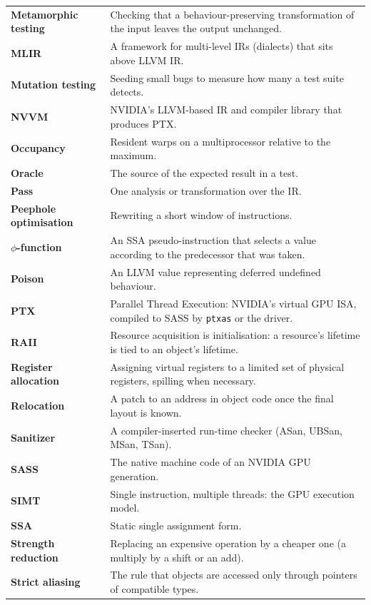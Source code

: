 \documentclass[10pt,a4paper,openany,oneside]{report}
\begin{document}
\begin{center}
\begin{xltabular}{\textwidth}{@{}L{3.6cm}Y@{}}
\textbf{Metamorphic testing} & Checking that a behaviour-preserving transformation of the input leaves the output unchanged.\\
\textbf{MLIR} & A framework for multi-level IRs (dialects) that sits above LLVM IR.\\
\textbf{Mutation testing} & Seeding small bugs to measure how many a test suite detects.\\
\textbf{NVVM} & NVIDIA's LLVM-based IR and compiler library that produces PTX.\\
\textbf{Occupancy} & Resident warps on a multiprocessor relative to the maximum.\\
\textbf{Oracle} & The source of the expected result in a test.\\
\textbf{Pass} & One analysis or transformation over the IR.\\
\textbf{Peephole optimisation} & Rewriting a short window of instructions.\\
\textbf{$\phi$-function} & An SSA pseudo-instruction that selects a value according to the predecessor that was taken.\\
\textbf{Poison} & An LLVM value representing deferred undefined behaviour.\\
\textbf{PTX} & Parallel Thread Execution: NVIDIA's virtual GPU ISA, compiled to SASS by \texttt{ptxas} or the driver.\\
\textbf{RAII} & Resource acquisition is initialisation: a resource's lifetime is tied to an object's lifetime.\\
\textbf{Register allocation} & Assigning virtual registers to a limited set of physical registers, spilling when necessary.\\
\textbf{Relocation} & A patch to an address in object code once the final layout is known.\\
\textbf{Sanitizer} & A compiler-inserted run-time checker (ASan, UBSan, MSan, TSan).\\
\textbf{SASS} & The native machine code of an NVIDIA GPU generation.\\
\textbf{SIMT} & Single instruction, multiple threads: the GPU execution model.\\
\textbf{SSA} & Static single assignment form.\\
\textbf{Strength reduction} & Replacing an expensive operation by a cheaper one (a multiply by a shift or an add).\\
\textbf{Strict aliasing} & The rule that objects are accessed only through pointers of compatible types.\\

\end{xltabular}
\end{center}
\end{document}
